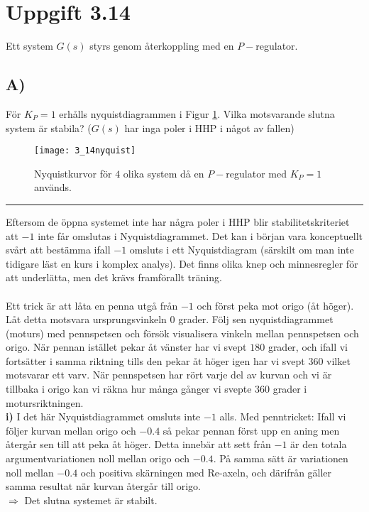 \documentclass[12pt]{article}
\newcommand{\qline}{\hrule \vspace*{10pt}}
\begin{document}
\section*{Uppgift 3.14}
Ett system $G(s)$ styrs genom återkoppling med en $P-$regulator.

\subsection*{A)}
För $K_P = 1$ erhålls nyquistdiagrammen i Figur \ref{fig:314nyquist}. Vilka motsvarande slutna system är stabila? ($G(s)$ har inga poler i HHP i något av fallen)

\begin{figure}[h!]
  \centering
  \texttt{[image: 3\_14nyquist]}
  \caption{Nyquistkurvor för $4$ olika system då en $P-$regulator med $K_P = 1$ används.}
  \label{fig:314nyquist}
\end{figure}
\FloatBarrier
\qline
Eftersom de öppna systemet inte har några poler i HHP blir stabilitetskriteriet att $-1$ inte får omslutas i Nyquistdiagrammet. Det kan i början vara konceptuellt svårt att bestämma ifall $-1$ omsluts i ett Nyquistdiagram (särskilt om man inte tidigare läst en kurs i komplex analys). Det finns olika knep och minnesregler för att underlätta, men det krävs framförallt träning. \\\\
Ett trick är att låta en penna utgå från $-1$ och först peka mot origo (åt höger). Låt detta motsvara ursprungsvinkeln $0$ grader. Följ sen nyquistdiagrammet (moturs) med pennspetsen och försök visualisera vinkeln mellan pennspetsen och origo. När pennan istället pekar åt vänster har vi svept $180$ grader, och ifall vi fortsätter i samma riktning tills den pekar åt höger igen har vi svept $360$ vilket motsvarar ett varv. När pennspetsen har rört varje del av kurvan och vi är tillbaka i origo kan vi räkna hur många gånger vi svepte $360$ grader i motursriktningen.\\

\textbf{i)} I det här Nyquistdiagrammet omsluts inte $-1$ alls. Med penntricket: Ifall vi följer kurvan mellan origo och $-0.4$ så pekar pennan först upp en aning men återgår sen till att peka åt höger. Detta innebär att sett från $-1$ är den totala argumentvariationen noll mellan origo och $-0.4$. På samma sätt är variationen noll mellan $-0.4$ och positiva skärningen med Re-axeln, och därifrån gäller samma resultat när kurvan återgår till origo.\\
$\Rightarrow$ Det slutna systemet är stabilt. \\
\end{document}
